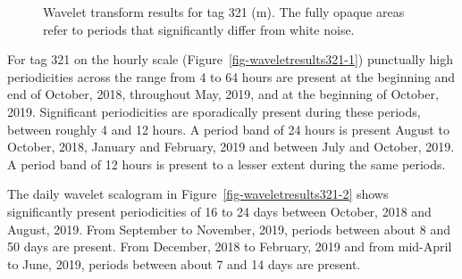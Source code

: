 \documentclass[
  authoryear,
  review,
  3p]{elsarticle}
\begin{document}
\begin{figure}

\begin{minipage}[t]{\linewidth}

{\centering 


}

\end{minipage}%
\newline
\begin{minipage}[t]{\linewidth}

{\centering 


}

\end{minipage}%

\caption{\label{fig-waveletresults321}Wavelet transform results for tag
321 (m). The fully opaque areas refer to periods that significantly
differ from white noise.}

\end{figure}

For tag 321 on the hourly scale (Figure~\ref{fig-waveletresults321-1})
punctually high periodicities across the range from 4 to 64 hours are
present at the beginning and end of October, 2018, throughout May, 2019,
and at the beginning of October, 2019. Significant periodicities are
sporadically present during these periods, between roughly 4 and 12
hours. A period band of 24 hours is present August to October, 2018,
January and February, 2019 and between July and October, 2019. A period
band of 12 hours is present to a lesser extent during the same periods.

The daily wavelet scalogram in Figure~\ref{fig-waveletresults321-2}
shows significantly present periodicities of 16 to 24 days between
October, 2018 and August, 2019. From September to November, 2019,
periods between about 8 and 50 days are present. From December, 2018 to
February, 2019 and from mid-April to June, 2019, periods between about 7
and 14 days are present.
\end{document}

